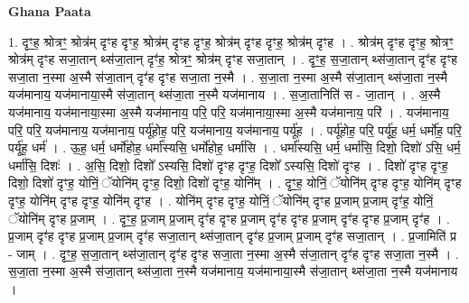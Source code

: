 \documentclass[17pt]{extarticle}
\begin{document}
\textbf{Ghana Paata } \newline

1. दृꣳ॒॒ह॒ श्रोत्रꣳ॒॒ श्रोत्र॑म् दृꣳह दृꣳह॒ श्रोत्र॑म् दृꣳह दृꣳह॒ श्रोत्र॑म् दृꣳह दृꣳह॒ श्रोत्र॑म् दृꣳह । . श्रोत्र॑म् दृꣳह दृꣳह॒ श्रोत्रꣳ॒॒ श्रोत्र॑म् दृꣳह सजा॒तान् थ्स॑जा॒तान् दृꣳ॑ह॒ श्रोत्रꣳ॒॒ श्रोत्र॑म् दृꣳह सजा॒तान् । . दृꣳ॒॒ह॒ स॒जा॒तान् थ्स॑जा॒तान् दृꣳ॑ह दृꣳह सजा॒ता न॒स्मा अ॒स्मै स॑जा॒तान् दृꣳ॑ह दृꣳह सजा॒ता न॒स्मै । . स॒जा॒ता न॒स्मा अ॒स्मै स॑जा॒तान् थ्स॑जा॒ता न॒स्मै यज॑मानाय॒ यज॑मानाया॒स्मै स॑जा॒तान् थ्स॑जा॒ता न॒स्मै यज॑मानाय । . स॒जा॒तानिति॑ स - जा॒तान् । . अ॒स्मै यज॑मानाय॒ यज॑मानाया॒स्मा अ॒स्मै यज॑मानाय॒ परि॒ परि॒ यज॑मानाया॒स्मा अ॒स्मै यज॑मानाय॒ परि॑ । . यज॑मानाय॒ परि॒ परि॒ यज॑मानाय॒ यज॑मानाय॒ पर्यू॑होह॒ परि॒ यज॑मानाय॒ यज॑मानाय॒ पर्यू॑ह । . पर्यू॑होह॒ परि॒ पर्यू॑ह॒ धर्म॒ धर्मो॑ह॒ परि॒ पर्यू॑ह॒ धर्म॑ । . ऊ॒ह॒ धर्म॒ धर्मो॑होह॒ धर्मा᳚स्यसि॒ धर्मो॑होह॒ धर्मा॑सि । . धर्मा᳚स्यसि॒ धर्म॒ धर्मा॑सि॒ दिशो॒ दिशो॑ ऽसि॒ धर्म॒ धर्मा॑सि॒ दिशः॑ । . अ॒सि॒ दिशो॒ दिशो᳚ ऽस्यसि॒ दिशो॑ दृꣳह दृꣳह॒ दिशो᳚ ऽस्यसि॒ दिशो॑ दृꣳह । . दिशो॑ दृꣳह दृꣳह॒ दिशो॒ दिशो॑ दृꣳह॒ योनिं॒ ॅयोनि॑म् दृꣳह॒ दिशो॒ दिशो॑ दृꣳह॒ योनि᳚म् । . दृꣳ॒॒ह॒ योनिं॒ ॅयोनि॑म् दृꣳह दृꣳह॒ योनि॑म् दृꣳह दृꣳह॒ योनि॑म् दृꣳह दृꣳह॒ योनि॑म् दृꣳह । . योनि॑म् दृꣳह दृꣳह॒ योनिं॒ ॅयोनि॑म् दृꣳह प्र॒जाम् प्र॒जाम् दृꣳ॑ह॒ योनिं॒ ॅयोनि॑म् दृꣳह प्र॒जाम् । . दृꣳ॒॒ह॒ प्र॒जाम् प्र॒जाम् दृꣳ॑ह दृꣳह प्र॒जाम् दृꣳ॑ह दृꣳह प्र॒जाम् दृꣳ॑ह दृꣳह प्र॒जाम् दृꣳ॑ह । . प्र॒जाम् दृꣳ॑ह दृꣳह प्र॒जाम् प्र॒जाम् दृꣳ॑ह सजा॒तान् थ्स॑जा॒तान् दृꣳ॑ह प्र॒जाम् प्र॒जाम् दृꣳ॑ह सजा॒तान् । . प्र॒जामिति॑ प्र - जाम् । . दृꣳ॒॒ह॒ स॒जा॒तान् थ्स॑जा॒तान् दृꣳ॑ह दृꣳह सजा॒ता न॒स्मा अ॒स्मै स॑जा॒तान् दृꣳ॑ह दृꣳह सजा॒ता न॒स्मै । . स॒जा॒ता न॒स्मा अ॒स्मै स॑जा॒तान् थ्स॑जा॒ता न॒स्मै यज॑मानाय॒ यज॑मानाया॒स्मै स॑जा॒तान् थ्स॑जा॒ता न॒स्मै यज॑मानाय । \newline
\end{document}
